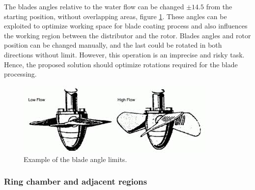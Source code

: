 The blades angles relative to the water flow can be changed $\pm 14.5$ from the
starting position, without overlapping areas, figure
\ref{fig::blades_angle}. These angles can be exploited to optimize working space
for blade coating process and also influences the working region between
the distributor and the rotor. Blades angles and rotor position can be changed
manually, and the last could be rotated in both directions without limit.
However, this operation is an imprecise and risky task. Hence, the proposed
solution should optimize rotations required for the blade processing.

\begin{figure}[h!]	
	\includegraphics[width=\columnwidth]{figs/intro/blades_angle}
	\caption{Example of the blade angle limits.}
	\label{fig::blades_angle}
\end{figure}

\subsubsection{Ring chamber and adjacent regions}

